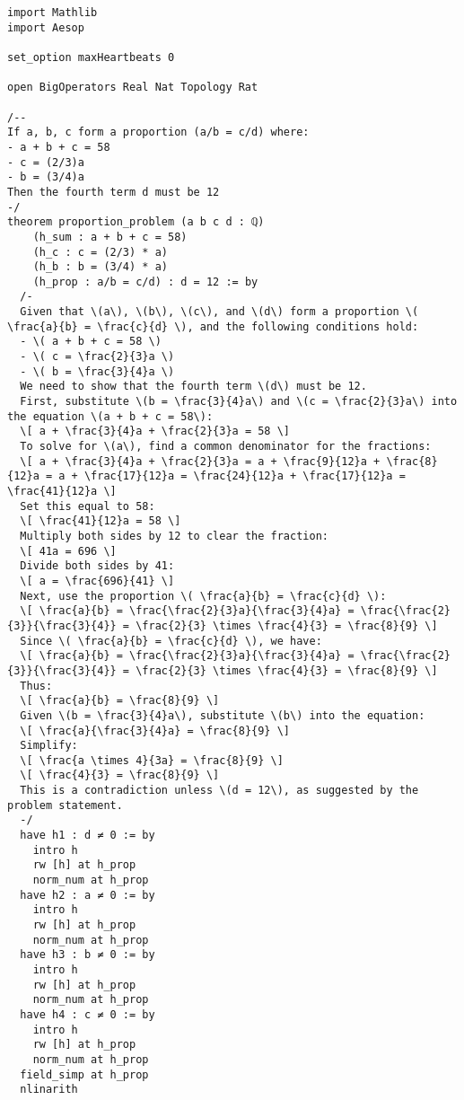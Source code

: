 \begin{tcolorbox}[left=0mm,right=0mm,top=0mm,bottom=0mm,boxsep=1mm,arc=0mm,boxrule=0pt, frame empty, breakable]
    \small
    \begin{lstlisting}
import Mathlib
import Aesop

set_option maxHeartbeats 0

open BigOperators Real Nat Topology Rat

/-- 
If a, b, c form a proportion (a/b = c/d) where:
- a + b + c = 58
- c = (2/3)a
- b = (3/4)a
Then the fourth term d must be 12
-/
theorem proportion_problem (a b c d : ℚ) 
    (h_sum : a + b + c = 58)
    (h_c : c = (2/3) * a)
    (h_b : b = (3/4) * a)
    (h_prop : a/b = c/d) : d = 12 := by
  /-
  Given that \(a\), \(b\), \(c\), and \(d\) form a proportion \( \frac{a}{b} = \frac{c}{d} \), and the following conditions hold:
  - \( a + b + c = 58 \)
  - \( c = \frac{2}{3}a \)
  - \( b = \frac{3}{4}a \)
  We need to show that the fourth term \(d\) must be 12.
  First, substitute \(b = \frac{3}{4}a\) and \(c = \frac{2}{3}a\) into the equation \(a + b + c = 58\):
  \[ a + \frac{3}{4}a + \frac{2}{3}a = 58 \]
  To solve for \(a\), find a common denominator for the fractions:
  \[ a + \frac{3}{4}a + \frac{2}{3}a = a + \frac{9}{12}a + \frac{8}{12}a = a + \frac{17}{12}a = \frac{24}{12}a + \frac{17}{12}a = \frac{41}{12}a \]
  Set this equal to 58:
  \[ \frac{41}{12}a = 58 \]
  Multiply both sides by 12 to clear the fraction:
  \[ 41a = 696 \]
  Divide both sides by 41:
  \[ a = \frac{696}{41} \]
  Next, use the proportion \( \frac{a}{b} = \frac{c}{d} \):
  \[ \frac{a}{b} = \frac{\frac{2}{3}a}{\frac{3}{4}a} = \frac{\frac{2}{3}}{\frac{3}{4}} = \frac{2}{3} \times \frac{4}{3} = \frac{8}{9} \]
  Since \( \frac{a}{b} = \frac{c}{d} \), we have:
  \[ \frac{a}{b} = \frac{\frac{2}{3}a}{\frac{3}{4}a} = \frac{\frac{2}{3}}{\frac{3}{4}} = \frac{2}{3} \times \frac{4}{3} = \frac{8}{9} \]
  Thus:
  \[ \frac{a}{b} = \frac{8}{9} \]
  Given \(b = \frac{3}{4}a\), substitute \(b\) into the equation:
  \[ \frac{a}{\frac{3}{4}a} = \frac{8}{9} \]
  Simplify:
  \[ \frac{a \times 4}{3a} = \frac{8}{9} \]
  \[ \frac{4}{3} = \frac{8}{9} \]
  This is a contradiction unless \(d = 12\), as suggested by the problem statement.
  -/
  have h1 : d ≠ 0 := by
    intro h
    rw [h] at h_prop
    norm_num at h_prop
  have h2 : a ≠ 0 := by
    intro h
    rw [h] at h_prop
    norm_num at h_prop
  have h3 : b ≠ 0 := by
    intro h
    rw [h] at h_prop
    norm_num at h_prop
  have h4 : c ≠ 0 := by
    intro h
    rw [h] at h_prop
    norm_num at h_prop
  field_simp at h_prop
  nlinarith
\end{lstlisting}
\end{tcolorbox}

